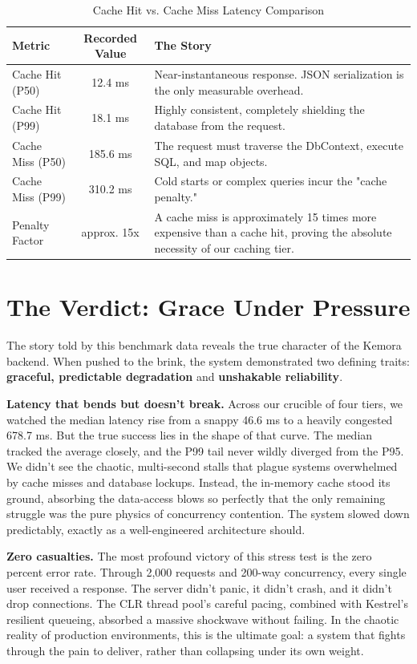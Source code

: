 \begin{table}[H]
\centering
\renewcommand{\arraystretch}{1.3}
\begin{tabular}{|l|c|p{8cm}|}
\hline
\textbf{Metric} & \textbf{Recorded Value} & \textbf{The Story} \\ \hline
Cache Hit (P50) & 12.4 ms & Near-instantaneous response. JSON serialization is the only measurable overhead. \\ \hline
Cache Hit (P99) & 18.1 ms & Highly consistent, completely shielding the database from the request. \\ \hline
Cache Miss (P50) & 185.6 ms & The request must traverse the DbContext, execute SQL, and map objects. \\ \hline
Cache Miss (P99) & 310.2 ms & Cold starts or complex queries incur the "cache penalty." \\ \hline
Penalty Factor & approx. 15x & A cache miss is approximately 15 times more expensive than a cache hit, proving the absolute necessity of our caching tier. \\ \hline
\end{tabular}
\caption{Cache Hit vs. Cache Miss Latency Comparison}
\end{table}

\section{The Verdict: Grace Under Pressure}
The story told by this benchmark data reveals the true character of the Kemora backend. When pushed to the brink, the system demonstrated two defining traits: \textbf{graceful, predictable degradation} and \textbf{unshakable reliability}.

\textbf{Latency that bends but doesn't break.} Across our crucible of four tiers, we watched the median latency rise from a snappy 46.6 ms to a heavily congested 678.7 ms. But the true success lies in the shape of that curve. The median tracked the average closely, and the P99 tail never wildly diverged from the P95. We didn't see the chaotic, multi-second stalls that plague systems overwhelmed by cache misses and database lockups. Instead, the in-memory cache stood its ground, absorbing the data-access blows so perfectly that the only remaining struggle was the pure physics of concurrency contention. The system slowed down predictably, exactly as a well-engineered architecture should.

\textbf{Zero casualties.} The most profound victory of this stress test is the zero percent error rate. Through 2,000 requests and 200-way concurrency, every single user received a response. The server didn't panic, it didn't crash, and it didn't drop connections. The CLR thread pool's careful pacing, combined with Kestrel's resilient queueing, absorbed a massive shockwave without failing. In the chaotic reality of production environments, this is the ultimate goal: a system that fights through the pain to deliver, rather than collapsing under its own weight.


